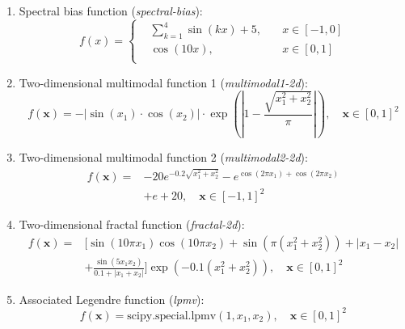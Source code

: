 \begin{enumerate}
    \item Spectral bias function (\textit{spectral-bias}):
    \begin{equation}
        f(x)=\left\{
        \begin{aligned}
         & \sum_{k=1}^4\sin(k x) + 5,&\quad x\in [-1, 0] \\
         & \cos(10x),&\quad x\in [0, 1] \\
        \end{aligned}
        \right.
    \end{equation}

    \item Two-dimensional multimodal function 1 (\textit{multimodal1-2d}):
    \begin{equation}
        f(\boldsymbol{x})=-|\sin(x_1) \cdot \cos(x_2)| \cdot \exp \left(|1-\frac{\sqrt{x_1^2+x_2^2}}{\pi}|\right),\quad \boldsymbol{x}\in [0,1]^{2}
    \end{equation}
    
    \item Two-dimensional multimodal function 2 (\textit{multimodal2-2d}):
    \begin{equation}
    \begin{aligned}
        f(\boldsymbol{x}) = & -20 e^{-0.2 \sqrt{x_1^2+x_2^2}}-e^{\cos(2\pi x_1) +\cos(2\pi x_2)}\\
        &+e+20,\quad \boldsymbol{x}\in [-1,1]^{2}
    \end{aligned}
    \end{equation}
    
    \item Two-dimensional fractal function (\textit{fractal-2d}):
    \begin{equation}
    \begin{aligned}
        f(\boldsymbol{x})= & [\sin(10\pi x_1) \cos(10\pi x_2)+\sin(\pi(x_1^2+x_2^2))+|x_1-x_2| \\
        &+\frac{\sin(5x_1x_2)}{0.1+|x_1+x_2|}] \exp(-0.1(x_1^2+x_2^2)),\quad \boldsymbol{x}\in [0,1]^{2}
    \end{aligned}
    \end{equation}
    
    \item Associated Legendre function (\textit{lpmv}):
    \begin{equation}
        f(\boldsymbol{x})=\text{scipy.special.lpmv}(1,x_1,x_2), \quad \boldsymbol{x}\in [0,1]^{2}
    \end{equation}
    

\end{enumerate}
